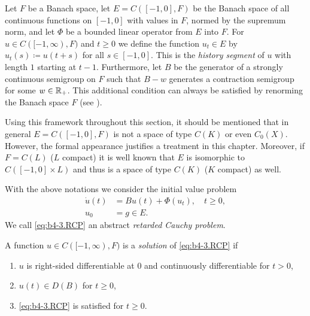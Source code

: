 Let $F$ be a Banach space, let $E = C([-1,0],F)$ be the Banach space of all continuous functions on $[-1,0]$ with values in $F$, normed by the supremum norm, and let $\Phi$ be a bounded linear operator from $E$ into $F$.
For $u \in C([-1,\infty),F)$ and $t \geq 0$ we define the function $u_{t} \in E$ by $u_{t}(s) \coloneq  u(t+s)$ for all $s \in [-1,0]$.
This is the \emph{history segment} of $u$ with length $1$ starting at $t-1$.
Furthermore, let $B$ be the generator of a strongly continuous semigroup on $F$ such that $B - w$ generates a contraction semigroup for some $w \in \mathbb{R}_{+}$.
This additional condition can always be satisfied by renorming the Banach space $F$ (see \eg \citet[Theorem~2.13]{goldstein:1985a}).

Using this framework throughout this section, it should be mentioned that in general $E = C([-1,0],F)$ is not a space of type $C(K)$ or even $C_{0}(X)$.
However, the formal appearance justifies a treatment in this chapter.
Moreover, if $F = C(L)$ ($L$ compact) it is well known that $E$ is isomorphic to $C([-1,0] \times L)$ and thus is a space of type $C(K)$ ($K$ compact) as well.

With the above notations we consider the initial value problem
\begin{equation*}\label{eq:b4-3.RCP} \tag{RCP}
	\begin{split}
		\dot{u}(t) &= Bu(t) + \Phi(u_{t}), \quad t \geq 0, \\
		u_{0} &= g \in E.
	\end{split}
\end{equation*}
We call \eqref{eq:b4-3.RCP} an abstract \emph{retarded Cauchy problem}.

A function $u \in C([-1,\infty),F)$ is a \emph{solution} of \eqref{eq:b4-3.RCP} if
\begin{enumerate}[\upshape (i)]
	\item 
	$u$ is right-sided differentiable at 0 and continuously differentiable for $t  >  0$,
	
	\item 
	$u(t) \in D(B)$ for $t \geq 0$,
    
	\item 
	\eqref{eq:b4-3.RCP} is satisfied for $t \geq 0$.
\end{enumerate}

